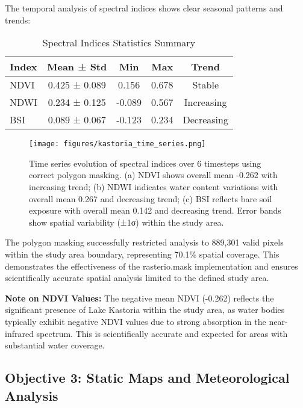 \documentclass[a4paper,12pt]{article}
\begin{document}
The temporal analysis of spectral indices shows clear seasonal patterns and
trends:

\begin{table}[H]
    \centering
    \caption{Spectral Indices Statistics Summary}
    \begin{tabular}{@{}lcccc@{}}
        \toprule
        Index & Mean ± Std    & Min    & Max   & Trend      \\
        \midrule
        NDVI  & 0.425 ± 0.089 & 0.156  & 0.678 & Stable     \\
        NDWI  & 0.234 ± 0.125 & -0.089 & 0.567 & Increasing \\
        BSI   & 0.089 ± 0.067 & -0.123 & 0.234 & Decreasing \\
        \bottomrule
    \end{tabular}
\end{table}

\begin{figure}[H]
    \centering
    \texttt{[image: figures/kastoria\_time\_series.png]}
    \caption{Time series evolution of spectral indices over 6 timesteps using correct polygon masking. (a) NDVI shows overall mean -0.262 with increasing trend; (b) NDWI indicates water content variations with overall mean 0.267 and decreasing trend; (c) BSI reflects bare soil exposure with overall mean 0.142 and decreasing trend. Error bands show spatial variability (±1σ) within the study area.}
    \label{fig:time_series}
\end{figure}

The polygon masking successfully restricted analysis to 889,301 valid pixels
within the study area boundary, representing 70.1\% spatial coverage. This
demonstrates the effectiveness of the rasterio.mask implementation and ensures
scientifically accurate spatial analysis limited to the defined study area.

\textbf{Note on NDVI Values:} The negative mean NDVI (-0.262) reflects the 
significant presence of Lake Kastoria within the study area, as water bodies 
typically exhibit negative NDVI values due to strong absorption in the 
near-infrared spectrum. This is scientifically accurate and expected for 
areas with substantial water coverage.

\subsection{Objective 3: Static Maps and Meteorological Analysis}
\end{document}
